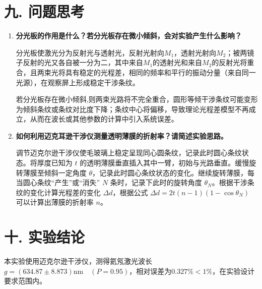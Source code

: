 \documentclass[12pt,a4paper]{article}
\begin{document}
	\section*{\textbf{{九. 问题思考}}}

	\begin{enumerate}
		\item \textbf{分光板的作用是什么？若分光板存在微小倾斜，会对实验产生什么影响？}

		分光板使激光分为反射光与透射光，反射光射向$M_1$，透射光射向$M_2$；被两镜子反射的光又各自被一分为二，其中来自$M_1$的透射光和来自$M_2$的反射光将重合，且两束光将具有稳定的光程差，相同的频率和平行的振动分量（来自同一光源），在观察屏上形成稳定干涉条纹。  

		若分光板存在微小倾斜,则两束光路将不完全重合，圆形等倾干涉条纹可能变形为倾斜条纹或条纹对比度下降；条纹中心将偏移，导致理论光程差模型不再成立，从而在波长或其他参数的计算中引入系统误差。
		
		\item \textbf{如何利用迈克耳逊干涉仪测量透明薄膜的折射率？请简述实验思路。}
		
		调节迈克尔逊干涉仪使毛玻璃上稳定呈现同心圆条纹，记录此时圆心条纹状态。将厚度已知为 $t$ 的透明薄膜垂直插入其中一臂，初始与光路垂直。缓慢旋转薄膜至倾斜一定角度 $\theta$，记录此时圆心条纹状态的变化。继续旋转薄膜，每当圆心条纹“产生”或“消失” $N$ 条时，记录下此时的旋转角度 $\theta_N$。根据干涉条纹的变化计算光程差的变化 $\Delta d$，根据公式 $\Delta d = 2t(n-1)(1-\cos\theta_N)$ 可以计算出薄膜的折射率 $n$。
	\end{enumerate}

	
	\section*{\textbf{{十. 实验结论}}}
	
	本实验使用迈克尔逊干涉仪，测得氦氖激光波长 $g = (634.87 \pm 8.873)\mathrm{nm} \quad (P=0.95)$，相对误差为$0.327\% < 1\% $，在实验设计要求范围内。
	
	
\end{document}
